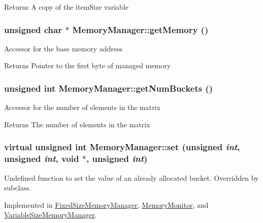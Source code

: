 \begin{DoxyReturn}{Returns}
A copy of the itemSize variable 
\end{DoxyReturn}
\hypertarget{classMemoryManager_a0b8102e0c6b8c3609678e11d1384efb2}{
\subsubsection[{getMemory}]{\setlength{\rightskip}{0pt plus 5cm}unsigned char $\ast$ MemoryManager::getMemory ()}}
\label{classMemoryManager_a0b8102e0c6b8c3609678e11d1384efb2}
Accessor for the base memory address

\begin{DoxyReturn}{Returns}
Pointer to the first byte of managed memory 
\end{DoxyReturn}
\hypertarget{classMemoryManager_a8ed9694ea695f4533afb06fc595d371f}{
\subsubsection[{getNumBuckets}]{\setlength{\rightskip}{0pt plus 5cm}unsigned int MemoryManager::getNumBuckets ()}}
\label{classMemoryManager_a8ed9694ea695f4533afb06fc595d371f}
Accessor for the number of elements in the matrix

\begin{DoxyReturn}{Returns}
The number of elements in the matrix 
\end{DoxyReturn}
\hypertarget{classMemoryManager_a53a7f4663f763985ce93f36d76d08370}{
\subsubsection[{set}]{\setlength{\rightskip}{0pt plus 5cm}virtual unsigned int MemoryManager::set (unsigned {\em int}, \/  unsigned {\em int}, \/  void $\ast$, \/  unsigned {\em int})}}
\label{classMemoryManager_a53a7f4663f763985ce93f36d76d08370}
Undefined function to set the value of an already allocated bucket. Overridden by subclass. 

Implemented in \hyperlink{classFixedSizeMemoryManager_a10ce34ce45161cf96e5e1232b8f45894}{FixedSizeMemoryManager}, \hyperlink{classMemoryMonitor_a57b86aac696c79f2c3018ee9878e15a3}{MemoryMonitor}, and \hyperlink{classVariableSizeMemoryManager_af13ce44cb2a151e6e31723b29e6a129d}{VariableSizeMemoryManager}.

